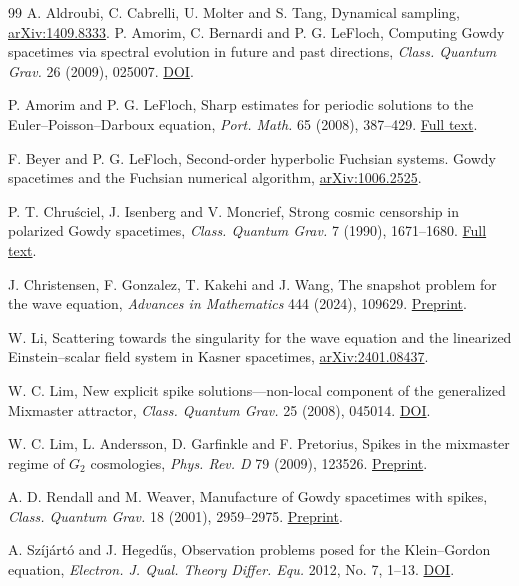 \documentclass[11pt]{article}
\begin{document}
\clearpage
\begin{thebibliography}{99}
 A. Aldroubi, C. Cabrelli, U. Molter and S. Tang,
Dynamical sampling, \href{https://arxiv.org/abs/1409.8333}{arXiv:1409.8333}.
 P. Amorim, C. Bernardi and P. G. LeFloch,
Computing Gowdy spacetimes via spectral evolution in future and past directions,
\emph{Class. Quantum Grav.} 26 (2009), 025007.
\href{https://doi.org/10.1088/0264-9381/26/2/025007}{DOI}.

 P. Amorim and P. G. LeFloch, Sharp estimates for periodic
solutions to the Euler--Poisson--Darboux equation,
\emph{Port. Math.} 65 (2008), 387--429.
\href{https://ems.press/content/serial-article-files/44605}{Full text}.

 F. Beyer and P. G. LeFloch, Second-order hyperbolic
Fuchsian systems. Gowdy spacetimes and the Fuchsian numerical algorithm,
\href{https://arxiv.org/abs/1006.2525}{arXiv:1006.2525}.

 P. T. Chru\'sciel, J. Isenberg and V. Moncrief,
Strong cosmic censorship in polarized Gowdy spacetimes,
\emph{Class. Quantum Grav.} 7 (1990), 1671--1680.
\href{https://homepage.univie.ac.at/piotr.chrusciel/papers/chrusciel/PolarisedGowdyCQG.pdf}{Full text}.

 J. Christensen, F. Gonzalez, T. Kakehi and J. Wang,
The snapshot problem for the wave equation,
\emph{Advances in Mathematics} 444 (2024), 109629.
\href{https://arxiv.org/abs/2308.12208}{Preprint}.

 W. Li, Scattering towards the singularity for the wave
equation and the linearized Einstein--scalar field system in Kasner spacetimes,
\href{https://arxiv.org/abs/2401.08437}{arXiv:2401.08437}.

 W. C. Lim, New explicit spike solutions---non-local
component of the generalized Mixmaster attractor,
\emph{Class. Quantum Grav.} 25 (2008), 045014.
\href{https://doi.org/10.1088/0264-9381/25/4/045014}{DOI}.

 W. C. Lim, L. Andersson, D. Garfinkle and F. Pretorius,
Spikes in the mixmaster regime of $G_2$ cosmologies,
\emph{Phys. Rev. D} 79 (2009), 123526.
\href{https://arxiv.org/abs/0904.1546}{Preprint}.

 A. D. Rendall and M. Weaver,
Manufacture of Gowdy spacetimes with spikes,
\emph{Class. Quantum Grav.} 18 (2001), 2959--2975.
\href{https://arxiv.org/abs/gr-qc/0103102}{Preprint}.

 A. Sz\'ij\'art\'o and J. Heged\H{u}s,
Observation problems posed for the Klein--Gordon equation,
\emph{Electron. J. Qual. Theory Differ. Equ.} 2012, No. 7, 1--13.
\href{https://doi.org/10.14232/ejqtde.2012.1.7}{DOI}.


\end{thebibliography}
\end{document}
